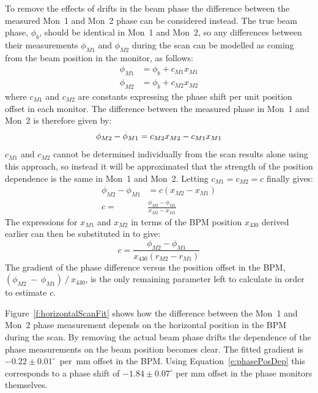 To remove the effects of drifts in the beam phase the difference between the measured Mon~1 and Mon~2 phase can be considered instead. The true beam phase, \(\phi_b\), should be identical in Mon~1 and Mon~2, so any differences between their measurements \(\phi_{M1}\) and \(\phi_{M2}\) during the scan can be modelled as coming from the beam position in the monitor, as follows:
\begin{align}
\phi_{M1} &= \phi_b + c_{M1}x_{M1} \\
\phi_{M2} &= \phi_b + c_{M2}x_{M2}
\end{align}
where \(c_{M1}\) and \(c_{M2}\) are constants expressing the phase shift per unit position offset in each monitor. The difference between the measured phase in Mon~1 and Mon~2 is therefore given by:
\begin{equation}
\phi_{M2}-\phi_{M1} = c_{M2}x_{M2} - c_{M1}x_{M1} \\
\end{equation}
\(c_{M1}\) and \(c_{M2}\) cannot be determined individually from the scan results alone using this approach, so instead it will be approximated that the strength of the position dependence is the same in Mon~1 and Mon~2. Letting \(c_{M1} = c_{M2} = c\) finally gives:
\begin{align}
\phi_{M2}-\phi_{M1} &= c(x_{M2}-x_{M1}) \\
c = &\frac{\phi_{M2}-\phi_{M1}}{x_{M2}-x_{M1}} 
\end{align}
The expressions for \(x_{M1}\) and \(x_{M2}\) in terms of the BPM position \(x_{430}\) derived earlier can then be substituted in to give:
\begin{equation}
c = \frac{\phi_{M2}-\phi_{M1}}{x_{430}(r_{M2}-r_{M1})}
\label{e:phasePosDep}
\end{equation}
The gradient of the phase difference versus the position offset in the BPM, \((\phi_{M2}~-~\phi_{M1})~/~x_{430}\), is the only remaining parameter left to calculate in order to estimate \(c\).

Figure~\ref{f:horizontalScanFit} shows how the difference between the Mon~1 and Mon~2 phase measurement depends on the horizontal position in the BPM during the scan. By removing the actual beam phase drifts the dependence of the phase measurements on the beam position becomes clear. The fitted gradient is \(-0.22\pm0.01^\circ\)~per~mm offset in the BPM. Using Equation~\ref{e:phasePosDep} this corresponds to a phase shift of \(-1.84\pm0.07^\circ\) per mm offset in the phase monitors themselves.

